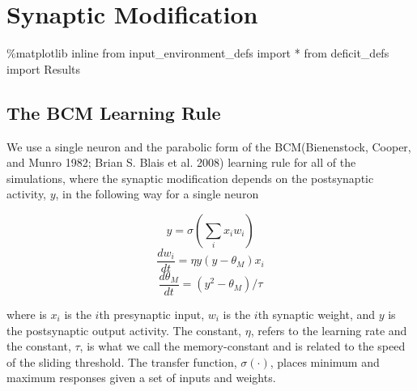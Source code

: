 \documentclass[
  letterpaper,
  DIV=11,
  numbers=noendperiod]{scrreprt}
\newenvironment{Shaded}{\begin{snugshade}}{\end{snugshade}}
\newcommand{\ImportTok}[1]{\textcolor[rgb]{0.00,0.46,0.62}{#1}}
\newcommand{\NormalTok}[1]{\textcolor[rgb]{0.00,0.23,0.31}{#1}}
\newcommand{\OperatorTok}[1]{\textcolor[rgb]{0.37,0.37,0.37}{#1}}
\begin{document}
\hypertarget{synaptic-modification}{%
\chapter{Synaptic Modification}\label{synaptic-modification}}

\begin{Shaded}
\begin{Highlighting}[]
\OperatorTok{\%}\NormalTok{matplotlib inline}
\ImportTok{from}\NormalTok{ input\_environment\_defs }\ImportTok{import} \OperatorTok{*}
\ImportTok{from}\NormalTok{ deficit\_defs }\ImportTok{import}\NormalTok{ Results}
\end{Highlighting}
\end{Shaded}

\hypertarget{the-bcm-learning-rule}{%
\section{The BCM Learning Rule}\label{the-bcm-learning-rule}}

We use a single neuron and the parabolic form of the BCM(Bienenstock,
Cooper, and Munro 1982; Brian S. Blais et al. 2008) learning rule for
all of the simulations, where the synaptic modification depends on the
postsynaptic activity, \(y\), in the following way for a single neuron

\[
y=\sigma\left(\sum_i x_i w_i \right)
\] \[
\frac{dw_i}{dt} = \eta y(y-\theta_M) x_i
\] \[
\frac{d\theta_M}{dt} = (y^2-\theta_M)/\tau
\]

where is \(x_i\) is the \(i\)th presynaptic input, \(w_i\) is the
\(i\)th synaptic weight, and \(y\) is the postsynaptic output activity.
The constant, \(\eta\), refers to the learning rate and the constant,
\(\tau\), is what we call the memory-constant and is related to the
speed of the sliding threshold. The transfer function,
\(\sigma(\cdot)\), places minimum and maximum responses given a set of
inputs and weights.
\end{document}

